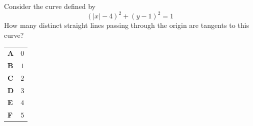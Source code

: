 \documentclass[11pt,a4paper]{article}
\begin{document}
\clearpage
\thispagestyle{djspaper}
\vspace*{8pt}
\begin{enumerate}[label=\textbf{\arabic*.},leftmargin=*,itemsep=0pt,start=11]
Consider the curve defined by \[ (|x|-4)^2+(y-1)^2=1 \] How many distinct straight lines passing through the origin are tangents to this curve?

\par\vspace*{12pt}
\begin{tabularx}{\linewidth}{@{}>{\bfseries}l Y@{}}
A &
$0$
\\[0.8em]
B &
$1$
\\[0.8em]
C &
$2$
\\[0.8em]
D &
$3$
\\[0.8em]
E &
$4$
\\[0.8em]
F &
$5$
\\
\end{tabularx}
\end{enumerate}
\clearpage
\thispagestyle{djspaper}
\vspace*{8pt}
\end{document}
